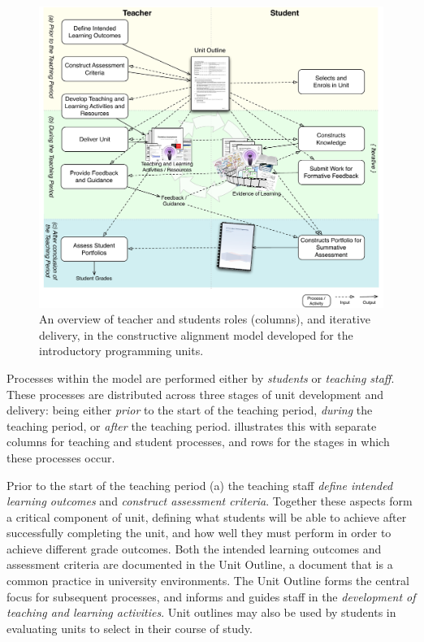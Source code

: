\begin{figure}[htbp]
	\centering
	\includegraphics[width=\textwidth]{ProcessOverview}
	\caption{An overview of teacher and students roles (columns), and iterative delivery, in the constructive alignment model developed for the introductory programming units.}
	\label{fig:process_overview}
\end{figure}

Processes within the model are performed either by \emph{students} or \emph{teaching staff}. These processes are distributed across three stages of unit development and delivery: being either \emph{prior} to the start of the teaching period, \emph{during} the teaching period, or \emph{after} the teaching period.  illustrates this with separate columns for teaching and student processes, and rows for the stages in which these processes occur.

Prior to the start of the teaching period (a) the teaching staff \emph{define intended learning outcomes} and \emph{construct assessment criteria}. Together these aspects form a critical component of unit, defining what students will be able to achieve after successfully completing the unit, and how well they must perform in order to achieve different grade outcomes. Both the intended learning outcomes and assessment criteria are documented in the Unit Outline, a document that is a common practice in university environments. The Unit Outline forms the central focus for subsequent processes, and informs and guides staff in the \emph{development of teaching and learning activities}. Unit outlines may also be used by students in evaluating units to select in their course of study.

